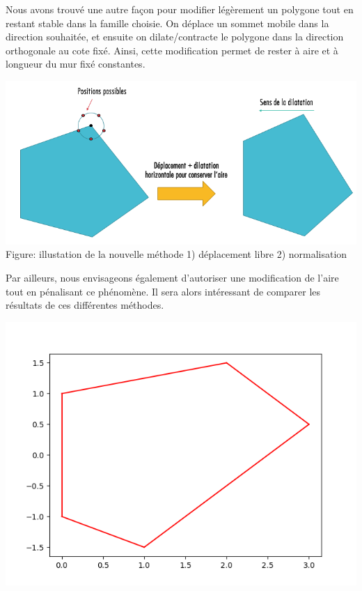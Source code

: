 \documentclass[a4paper,reqno]{article}
\begin{document}
Nous avons trouvé une autre façon pour modifier légèrement un polygone tout en restant stable dans la famille choisie. On déplace un sommet mobile dans la direction souhaitée, et ensuite on dilate/contracte le polygone dans la direction orthogonale au cote fixé. Ainsi, cette modification permet de rester à aire et à longueur du mur fixé constantes.
\begin{center}
	\includegraphics[scale=0.5]{alternatif.png}
\\ Figure: illustation de la nouvelle méthode 1) déplacement libre 2) normalisation
\end{center}
Par ailleurs, nous envisageons également d'autoriser une modification de l'aire tout en pénalisant ce phénomène. 
Il sera alors intéressant de comparer les résultats de ces différentes méthodes.

\begin{center}
\includegraphics[scale=0.5]{initialPolygon.png}
\end{center}
\end{document}
